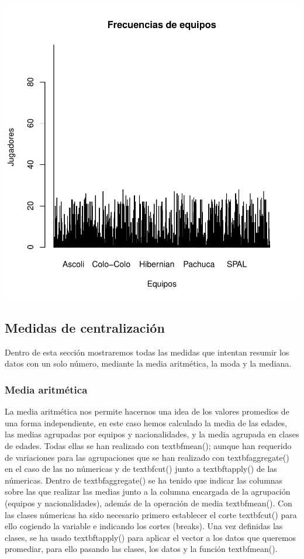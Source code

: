 \documentclass [a4paper] {article}
\begin{document}
\begin{center}
\includegraphics{Practica1-031}
\end{center}

\subsection{Medidas de centralización}
Dentro de esta sección mostraremos todas las medidas que intentan resumir los datos con un solo número, mediante la media aritmética,
la moda y la mediana.

\subsubsection{Media aritmética}
La media aritmética nos permite hacernos una idea de los valores promedios de una forma independiente, en este caso hemos calculado la media de las edades,
las medias agrupadas por equipos y nacionalidades, y la media agrupada en clases de edades. Todas ellas se han realizado con textbf{mean()}; aunque han requerido
de variaciones para las agrupaciones que se han realizado con textbf{aggregate()} en el caso de las no númericas y de textbf{cut()} junto a
 textbf{tapply()} de las númericas.
Dentro de textbf{aggregate()} se ha tenido que indicar las columnas sobre las que realizar las medias junto a la columna encargada de la 
agrupación (equipos y nacionalidades), 
además de la operación de media textbf{mean()}. Con las clases númericas ha sido necesario primero establecer el corte textbf{cut()} 
 para ello cogiendo la variable e indicando los 
cortes (breaks). Una vez definidas las clases, se ha usado textbf{tapply()} para aplicar el vector a los datos que queremos promediar, 
para ello pasando las clases, los datos y la función textbf{mean()}.
\end{document}
